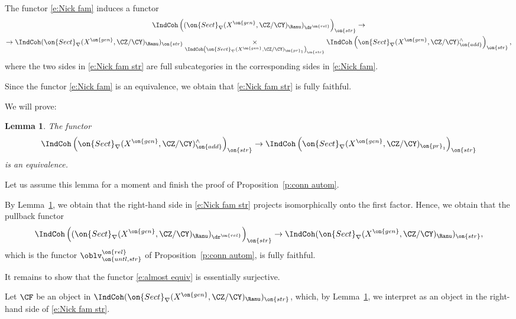 \documentclass[9pt]{amsart}
\newtheorem{lem}[subsubsection]{Lemma}
\theoremstyle{remark}
\theoremstyle{definition}
\theoremstyle{remark}
\newcommand{\lemref}[1]{Lemma~\ref{#1}}
\newcommand{\propref}[1]{Proposition~\ref{#1}}
\numberwithin{equation}{section}
\begin{document}
\ssec{Proof of \propref{p:conn autom}}

\sssec{}

The functor \eqref{e:Nick fam} induces a functor
\begin{multline} \label{e:Nick fam str}
\IndCoh\left((\on{Sect}_\nabla(X^{\on{gen}},\CZ/\CY)_\Ranu)_{\dr^{\on{rel}}}\right)_{\on{str}}
\to \\
\to \IndCoh(\on{Sect}_\nabla(X^{\on{gen}},\CZ/\CY)_\Ranu)_{\on{str}}
\underset{\IndCoh\left(\on{Sect}_\nabla(X^{\on{gen}},\CZ/\CY)_{\on{pr}_1}\right)_{\on{str}}}
\times \IndCoh\left(\on{Sect}_\nabla(X^{\on{gen}},\CZ/\CY)^\wedge_{\on{add}}\right)_{\on{str}},
\end{multline}
where the two sides in \eqref{e:Nick fam str} are full subcategories in the corresponding sides in \eqref{e:Nick fam}.  

\medskip

Since the functor \eqref{e:Nick fam} is an equivalence, we obtain that \eqref{e:Nick fam str} is fully faithful.

\sssec{}

We will prove:

\begin{lem} \label{l:cofinal}
The functor
$$\IndCoh\left(\on{Sect}_\nabla(X^{\on{gen}},\CZ/\CY)^\wedge_{\on{add}}\right)_{\on{str}}\to \IndCoh\left(\on{Sect}_\nabla(X^{\on{gen}},\CZ/\CY)_{\on{pr}_1}\right)_{\on{str}}$$
is an equivalence. 
\end{lem}

Let us assume this lemma for a moment and finish the proof of \propref{p:conn autom}. 

\sssec{}

By \lemref{l:cofinal}, we obtain that the right-hand side in \eqref{e:Nick fam str} projects isomorphically onto the first factor.
Hence, we obtain that the pullback functor
\begin{equation} \label{e:almost equiv}
\IndCoh\left((\on{Sect}_\nabla(X^{\on{gen}},\CZ/\CY)_\Ranu)_{\dr^{\on{rel}}}\right)_{\on{str}}\to 
\IndCoh(\on{Sect}_\nabla(X^{\on{gen}},\CZ/\CY)_\Ranu)_{\on{str}},
\end{equation}
which is the functor $\oblv^{\on{rel}}_{\on{untl,str}}$ of \propref{p:conn autom}, is fully faithful. 

\medskip

It remains to show that the functor \eqref{e:almost equiv} is essentially surjective.

\sssec{}

Let $\CF$ be an object in $\IndCoh(\on{Sect}_\nabla(X^{\on{gen}},\CZ/\CY)_\Ranu)_{\on{str}}$, which, by \lemref{l:cofinal},
we interpret as an object in the right-hand side of \eqref{e:Nick fam str}. 
\end{document}
